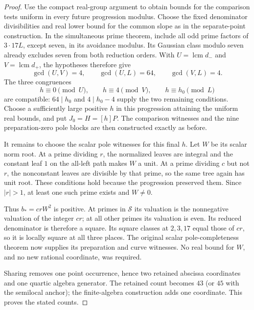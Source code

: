 \begin{proof}
Use the compact real-group argument to obtain bounds for the comparison
tests uniform in every future progression modulus.  Choose the fixed
denominator divisibilities and real lower bound for the common slope as
in the separate-point construction.  In the simultaneous prime theorem,
include all odd prime factors of $3\cdot17L$, except seven, in its avoidance
modulus.  Its Gaussian class modulo seven already excludes seven from
both reduction orders.  With $U=\operatorname{lcm}d_-$ and
$V=\operatorname{lcm}d_+$, the hypotheses therefore give
\[
 \gcd(U,V)=4,\qquad \gcd(U,L)=64,\qquad \gcd(V,L)=4.
\]
The three congruences
\[
 h\equiv0\pmod U,\qquad h\equiv4\pmod V,
 \qquad h\equiv h_0\pmod L
\]
are compatible: $64\mid h_0$ and $4\mid h_0-4$ supply the two remaining
conditions.  Choose a sufficiently large positive $h$ in this progression
attaining the uniform real bounds, and put $J_0=H=[h]P$.
The comparison witnesses and the nine preparation-zero pole blocks are
then constructed exactly as before.

It remains to choose the scalar pole witnesses for this final $h$.
Let $W$ be its scalar norm root.  At a prime dividing $r$, the normalized
leaves are integral and the constant leaf $1$ on the all-left path makes
$W$ a unit.  At a prime dividing $c$ but not $r$, the nonconstant leaves
are divisible by that prime, so the same tree again has unit root.
These conditions hold because the progression preserved them.  Since
$|r|>1$, at least one such prime exists and $W\ne0$.

Thus $b_*=crW^2$ is positive.  At primes in $\mathcal S$ its valuation is
the nonnegative valuation of the integer $cr$; at all other primes its
valuation is even.  Its reduced denominator is therefore a square.
Its square classes at $2,3,17$ equal those of $cr$, so it is locally square
at all three places.  The original scalar pole-completeness theorem now
supplies its preparation and curve witnesses.  No real bound for $W$,
and no new rational coordinate, was required.

Sharing removes one point occurrence, hence two retained abscissa
coordinates and one quartic algebra generator.  The retained count becomes
$43$ (or $45$ with the semilocal anchor); the finite-algebra construction
adds one coordinate.  This proves the stated counts.
\end{proof}
